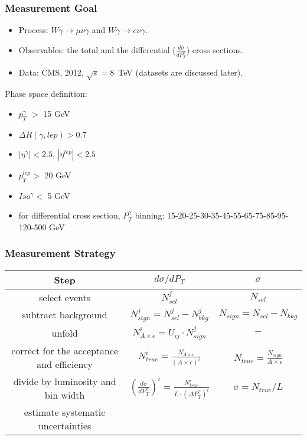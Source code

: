 \begin{frame}\frametitle{Measurement Goal}
  \scriptsize

  \begin{itemize}
    \item Process: $W\gamma\rightarrow\mu\nu\gamma$ and $W\gamma\rightarrow e\nu\gamma$.
    \item Observables: the total and the differential ($\frac{d\sigma}{dP_T^{\gamma}}$) cross sections.
    \item Data: CMS, 2012, $\sqrt{s}=$8~TeV (datasets are discussed later).
  \end{itemize}

  Phase space definition:
  \begin{itemize}
  \item $p_T^{\gamma}$ $>$ 15 GeV
  \item $\Delta{R}(\gamma,lep) > 0.7$
  \item $|\eta^{\gamma}|<2.5$, $|\eta^{lep}|<2.5$
  \item $p_T^{lep}>$ 20 GeV
  \item $Iso^{\gamma}<$ 5 GeV
  \item for differential cross section, $P_T^{\gamma}$ binning: 15-20-25-30-35-45-55-65-75-85-95-120-500 GeV
  \end{itemize}
\end{frame}%

\begin{frame}\frametitle{Measurement Strategy}
\begin{table}[h]
  \scriptsize
  \begin{center}
  \begin{tabular}{|c|c|c|}
    \hline
    Step & $d\sigma/dP_{T}$ & $\sigma$ \\ \hline
    select events & $N_{sel}^j$ &    $N_{sel}$       \\ \hline
    subtract background & $N_{sign}^j = N_{sel}^j - N_{bkg}^j$ &    $N_{sign}=N_{sel}-N_{bkg}$       \\ \hline
    unfold   & $N_{A\times\epsilon}^i = U_{ij} \cdot N_{sign}^j$ &    $-$       \\ \hline
    correct for the acceptance and efficiency & $N_{true}^i = \frac{N_{A\times\epsilon}^i}{(A \times\epsilon)^i}$ &  $N_{true}=\frac{N_{sign}}{A\times\epsilon}$       \\ \hline
    divide by luminosity and bin width & $ \left( \frac{d\sigma}{dP_{T}^\gamma} \right) ^i = \frac{N_{true}^i}{L \cdot (\Delta P_T^\gamma)^i}$  &  $\sigma = N_{true}/L$       \\ \hline
    estimate systematic uncertainties &  &         \\ \hline
  \end{tabular}
  \label{tab:analysisOutline}
  \end{center}
\end{table}
\end{frame}%
